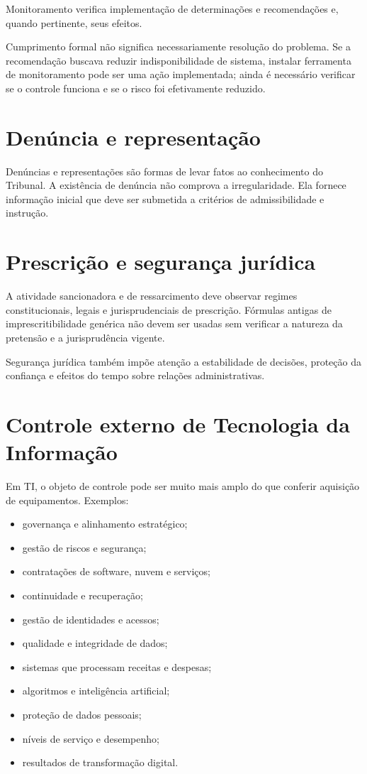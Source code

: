 Monitoramento verifica implementação de determinações e recomendações e, quando pertinente, seus efeitos.

Cumprimento formal não significa necessariamente resolução do problema. Se a recomendação buscava reduzir indisponibilidade de sistema, instalar ferramenta de monitoramento pode ser uma ação implementada; ainda é necessário verificar se o controle funciona e se o risco foi efetivamente reduzido.

\section{Denúncia e representação}

Denúncias e representações são formas de levar fatos ao conhecimento do Tribunal. A existência de denúncia não comprova a irregularidade. Ela fornece informação inicial que deve ser submetida a critérios de admissibilidade e instrução.

\section{Prescrição e segurança jurídica}

A atividade sancionadora e de ressarcimento deve observar regimes constitucionais, legais e jurisprudenciais de prescrição. Fórmulas antigas de imprescritibilidade genérica não devem ser usadas sem verificar a natureza da pretensão e a jurisprudência vigente.

Segurança jurídica também impõe atenção a estabilidade de decisões, proteção da confiança e efeitos do tempo sobre relações administrativas.

\section{Controle externo de Tecnologia da Informação}

Em TI, o objeto de controle pode ser muito mais amplo do que conferir aquisição de equipamentos. Exemplos:
\begin{itemize}
\item governança e alinhamento estratégico;
\item gestão de riscos e segurança;
\item contratações de software, nuvem e serviços;
\item continuidade e recuperação;
\item gestão de identidades e acessos;
\item qualidade e integridade de dados;
\item sistemas que processam receitas e despesas;
\item algoritmos e inteligência artificial;
\item proteção de dados pessoais;
\item níveis de serviço e desempenho;
\item resultados de transformação digital.
\end{itemize}


